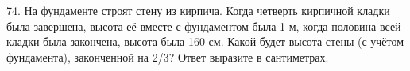 74. На фундаменте строят стену из кирпича. Когда четверть кирпичной кладки была завершена, высота её вместе с фундаментом была 1 м, когда половина всей кладки была закончена, высота была 160 см. Какой будет высота стены (с учётом фундамента), законченной на 2/3? Ответ выразите в сантиметрах.\\
